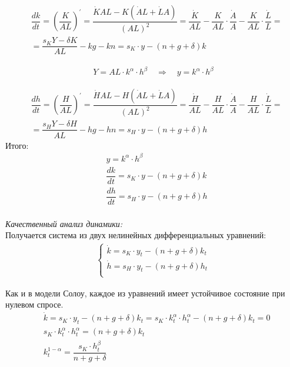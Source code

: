 \documentclass[14pt,fleqn]{extarticle}
\begin{document}
	\newpage
	\begin{align*}
	& \dfrac{dk}{dt} = \left(\dfrac{K}{AL}\right)^{'} = \dfrac{\dot{K} AL - K(\dot{A}L + \dot{L}A)}{(AL)^2} = \dfrac{\dot{K}}{AL} - \dfrac{K}{AL} \cdot \dfrac{\dot{A}}{A} - \dfrac{K}{AL} \cdot \dfrac{\dot{L}}{L} =\\
	& = \dfrac{s_K Y - \delta K}{AL} - kg - kn = s_K \cdot y - (n + g + \delta) k
	\end{align*}

	\begin{align*}
	Y = AL \cdot k^\alpha \cdot h^\beta \quad \Rightarrow \quad y = k^\alpha \cdot h^\beta
	\end{align*}

	\begin{align*}
	& \dfrac{dh}{dt} = \left(\dfrac{H}{AL}\right)^{'} = \dfrac{\dot{H} AL - H(\dot{A}L + \dot{L}A)}{(AL)^2} = \dfrac{\dot{H}}{AL} - \dfrac{H}{AL} \cdot \dfrac{\dot{A}}{A} - \dfrac{H}{AL} \cdot \dfrac{\dot{L}}{L} =\\
	& = \dfrac{s_H Y - \delta H}{AL} - hg - hn = s_H \cdot y - (n + g + \delta) h
	\end{align*}
	\newline
	Итого:
	\begin{align*}
		& y = k^\alpha \cdot h^\beta\\
		& \dfrac{dk}{dt} = s_K \cdot y - (n + g + \delta) k\\
		& \dfrac{dh}{dt} = s_H \cdot y - (n + g + \delta) h\\
	\end{align*}

	\textit{Качественный анализ динамики:}\\
	
	Получается система из двух нелинейных дифференциальных уравнений:
	\begin{align*}
		\begin{cases}
		\dot{k} = s_K \cdot y_t - (n + g + \delta) k_t\\
		\dot{h} = s_H \cdot y_t - (n + g + \delta) h_t\\
		\end{cases}
	\end{align*}

	Как и в модели Солоу, каждое из уравнений имеет устойчивое состояние при нулевом спросе.
	\begin{align*}
		& \dot{k} = s_K \cdot y_t - (n + g + \delta) k_t = s_K \cdot k_t^\alpha \cdot h_t^\alpha - (n + g + \delta) k_t = 0\\
		& s_K \cdot k_t^\alpha \cdot h_t^\alpha = (n + g + \delta) k_t\\
		& k_t^{1-\alpha} = \dfrac{s_K \cdot h_t^\beta}{n + g + \delta}
	\end{align*}
	
\end{document}

